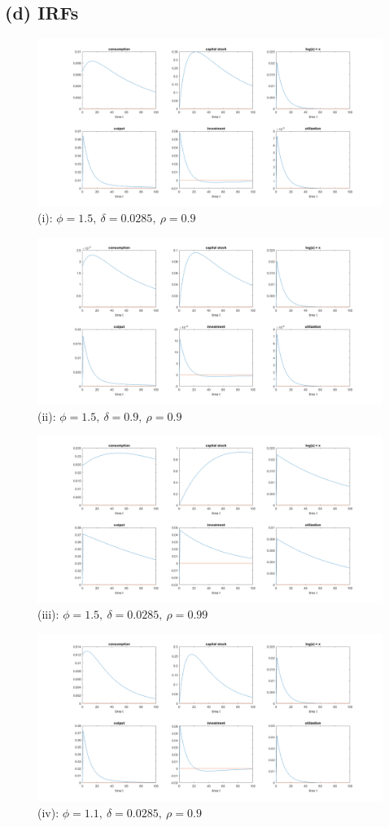 \documentclass[a4paper]{article}
\theoremstyle{definition}
\begin{document}
\newpage
\subsection{(d) IRFs}
	\begin{figure}[!h]
	\centering
	\caption{(i): $\phi = 1.5,\ \delta = 0.0285,\ \rho = 0.9$}
	\includegraphics[width=\textwidth]{param1.png}
	\end{figure}
	\begin{figure}[!h]
	\centering
	\caption{(ii): $\phi = 1.5,\ \delta = 0.9,\ \rho = 0.9$}
	\includegraphics[width=\textwidth]{param2.png}
	\end{figure}
		\begin{figure}[!h]
	\centering
	\caption{(iii): $\phi = 1.5,\ \delta = 0.0285,\ \rho = 0.99$}
	\includegraphics[width=\textwidth]{param3.png}
	\end{figure}
		\begin{figure}[!h]
	\centering
	\caption{(iv): $\phi = 1.1,\ \delta = 0.0285,\ \rho = 0.9$}
	\includegraphics[width=\textwidth]{param4.png}
	\end{figure}
\end{document}
